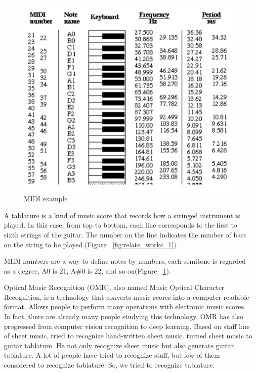 \documentclass[10pt,twocolumn,letterpaper]{article}
\begin{document}
\begin{CJK}{UTF8}{bsmi}
\begin{figure}[t]
\begin{center}
   \includegraphics[width=0.8\linewidth]{relate_works_2.png}
\end{center}
   \caption{MIDI example\cite{midi_number}}
\label{fig:relate_works_2}
\end{figure}

A tablature is a kind of music score that records how a stringed instrument is played. In this case, from top to bottom, each line corresponds to the first to sixth strings of the guitar. The number on the line indicates the number of bars on the string to be played.(Figure ~\ref{fig:relate_works_1}).

MIDI numbers are a way to define notes by numbers, each semitone is regarded as a degree, A0 is 21, A\#0 is 22, and so on(Figure ~\ref{fig:relate_works_2}).

Optical Music Recognition (OMR), also named Music Optical Character Recognition, is a technology that converts music scores into a computer-readable format\cite{omr_survey}. Allows people to perform many operations with electronic music scores. In fact, there are already many people studying this technology. OMR has also progressed from computer vision recognition to deep learning.
Based on staff line of sheet music, \cite{staff_detection} tried to recognize hand-written sheet music.
\cite{expert_system} turned sheet music to guitar tablature. He not only recognize sheet music but also generate guitar tablature. 
A lot of people have tried to recognize staff, but few of them considered to recognize tablature.
So, we tried to recognize tablature.



\end{CJK}
\end{document}
